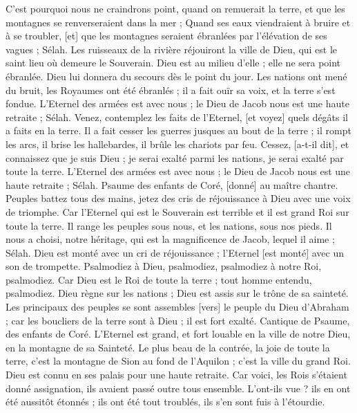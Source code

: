 \begin{multicols}{2}
C'est pourquoi nous ne craindrons point, quand on remuerait la terre, et que les montagnes se renverseraient dans la mer ;
Quand ses eaux viendraient à bruire et à se troubler, [et] que les montagnes seraient ébranlées par l'élévation de ses vagues ; Sélah.
Les ruisseaux de la rivière réjouiront la ville de Dieu, qui est le saint lieu où demeure le Souverain.
Dieu est au milieu d'elle ; elle ne sera point ébranlée. Dieu lui donnera du secours dès le point du jour.
Les nations ont mené du bruit, les Royaumes ont été ébranlés ; il a fait ouïr sa voix, et la terre s'est fondue.
L'Eternel des armées est avec nous ; le Dieu de Jacob nous est une haute retraite ; Sélah.
Venez, contemplez les faits de l'Eternel, [et voyez] quels dégâts il a faits en la terre.
Il a fait cesser les guerres jusques au bout de la terre ; il rompt les arcs, il brise les hallebardes, il brûle les chariots par feu.
Cessez, [a-t-il dit], et connaissez que je suis Dieu ; je serai exalté parmi les nations, je serai exalté par toute la terre.
L'Eternel des armées est avec nous ; le Dieu de Jacob nous est une haute retraite ; Sélah.
\VerseOne{}Psaume des enfants de Coré, [donné] au maître chantre. Peuples battez tous des mains, jetez des cris de réjouissance à Dieu avec une voix de triomphe.
Car l'Eternel qui est le Souverain est terrible et il est grand Roi sur toute la terre.
Il range les peuples sous nous, et les nations, sous nos pieds.
Il nous a choisi, notre héritage, qui est la magnificence de Jacob, lequel il aime ; Sélah.
Dieu est monté avec un cri de réjouissance ; l'Eternel [est monté] avec un son de trompette.
Psalmodiez à Dieu, psalmodiez, psalmodiez à notre Roi, psalmodiez.
Car Dieu est le Roi de toute la terre ; tout homme entendu, psalmodiez.
Dieu règne sur les nations ; Dieu est assis sur le trône de sa sainteté.
Les principaux des peuples se sont assembles [vers] le peuple du Dieu d'Abraham ; car les boucliers de la terre sont à Dieu ; il est fort exalté.
\VerseOne{}Cantique de Psaume, des enfants de Coré. L'Eternel est grand, et fort louable en la ville de notre Dieu, en la montagne de sa Sainteté.
Le plus beau de la contrée, la joie de toute la terre, c'est la montagne de Sion au fond de l'Aquilon ; c'est la ville du grand Roi.
Dieu est connu en ses palais pour une haute retraite.
Car voici, les Rois s'étaient donné assignation, ils avaient passé outre tous ensemble.
L'ont-ils vue ? ils en ont été aussitôt étonnés ; ils ont été tout troublés, ils s'en sont fuis à l'étourdie.

\end{multicols}
